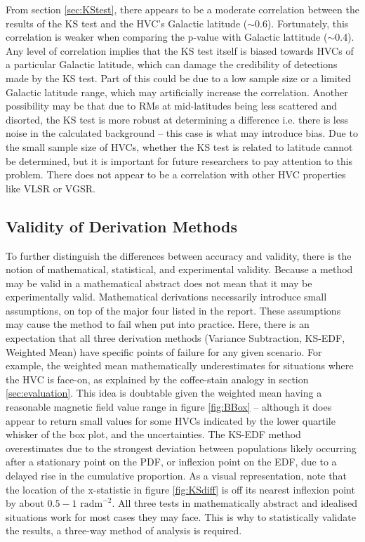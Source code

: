 From section \ref{sec:KStest}, there appears to be a moderate correlation between the results of the KS test and the HVC's Galactic latitude ($\sim$0.6). Fortunately, this correlation is weaker when comparing the p-value with Galactic lattitude ($\sim$0.4). Any level of correlation implies that the KS test itself is biased towards HVCs of a particular Galactic latitude, which can damage the credibility of detections made by the KS test. Part of this could be due to a low sample size or a limited Galactic latitude range, which may artificially increase the correlation. Another possibility may be that due to RMs at mid-latitudes being less scattered and disorted, the KS test is more robust at determining a difference i.e. there is less noise in the calculated background – this case is what may introduce bias. Due to the small sample size of HVCs, whether the KS test is related to latitude cannot be determined, but it is important for future researchers to pay attention to this problem. There does not appear to be a correlation with other HVC properties like VLSR or VGSR.

\subsection{Validity of Derivation Methods}
\label{ssec:B3}

To further distinguish the differences between accuracy and validity, there is the notion of mathematical, statistical, and experimental validity. Because a method may be valid in a mathematical abstract does not mean that it may be experimentally valid. Mathematical derivations necessarily introduce small assumptions, on top of the major four listed in the report. These assumptions may cause the method to fail when put into practice. Here, there is an expectation that all three derivation methods (Variance Subtraction, KS-EDF, Weighted Mean) have specific points of failure for any given scenario. For example, the weighted mean mathematically underestimates for situations where the HVC is face-on, as explained by the coffee-stain analogy in section \ref{sec:evaluation}. This idea is doubtable given the weighted mean having a reasonable magnetic field value range in figure \ref{fig:BBox} – although it does appear to return small values for some HVCs indicated by the lower quartile whisker of the box plot, and the uncertainties. The KS-EDF method overestimates due to the strongest deviation between populations likely occurring after a stationary point on the PDF, or inflexion point on the EDF, due to a delayed rise in the cumulative proportion. As a visual representation, note that the location of the x-statistic in figure \ref{fig:KSdiff} is off its nearest inflexion point by about $0.5-1$ $\mathrm{rad m}^{-2}$. All three tests in mathematically abstract and idealised situations work for most cases they may face. This is why to statistically validate the results, a three-way method of analysis is required.


